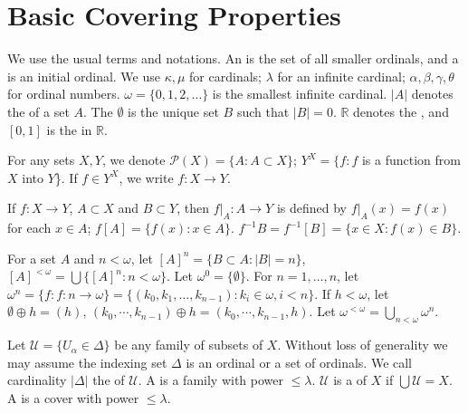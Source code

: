 \documentclass[prelim.tex]{subfiles}
\begin{document}
\section{Basic Covering Properties}  
\label{sec:1.1}

We use the  usual terms and notations. 
An  
is the set of all smaller ordinals, 
and a  
 is an initial ordinal. 
We use $\kappa, \mu$ for cardinals; $\lambda$
for an infinite cardinal;  $\alpha, \beta, \gamma, \theta$ for ordinal numbers. $\omega = \{0, 1, 2, \dots\}$ is the smallest infinite cardinal. 
$|A|$ denotes the  
 of a set $A$.
The   $\emptyset$ is the unique set $B$ such that $|B| = 0$.
$\mathbb{R}$ denotes the  
,
and $[0, 1]$ is the   
in $\mathbb{R}$.

For any sets $X, Y$, we denote 
$\mathscr{P}(X) = \{A: A \subset{X}\}$; 
$Y^X= \{f: f$  is a function from $X$  into $Y$\}. 
If $f \in Y^X$, we write $f: X \to Y$.

If $f: X \to Y$, $A \subset X$ and $B \subset Y$, then $f|_A: A \to Y$
 is defined by $f|_A(x) = f(x)$ for each $x \in A$; 
 $f[A] = \{f(x): x \in A\}$. $f^{-1}B = f^{-1}[B] = \{x \in X: f(x) \in B\}$.

For a set $A$ and $n < \omega$,
let $[A]^{n} = \{ B \subset A: | B| = n \}$,
$[A]^{< \omega} = \bigcup \{ [A]^{n}: n < \omega \}$. 
Let $ \omega^0 = \{ \emptyset \}$. For  $n = 1, \dots, n$, let
$\omega^n = \{ f: f: n \to \omega \} = \{ ( k_{0}, k_{1}, \dots, k_{n-1} ):  k_i \in\omega, i < n\} $.
If $h < \omega$, let $\emptyset\oplus h = (h)$, 
$(k_0, \cdots, k_{n-1})\oplus h = (k_0, \cdots, k_{n-1}, h)$.	
Let $\omega^{<\omega} = \bigcup_{n<\omega}\omega^{n}$.
	
Let  $\mathscr{U} = \{ U_\alpha\in \Delta\} $ be any family of subsets of  $X$. 
Without loss of generality we may assume the indexing set  $ \Delta $ is an ordinal or a set of ordinals. We call
cardinality $|\Delta|$ the 
of $\mathscr{U}$. A  is a family with power $\le \lambda$. $\mathscr{U}$ is a  of $X$ if $\bigcup \mathscr{U} = X$. A  is a cover with power $\le \lambda$.
\end{document}
